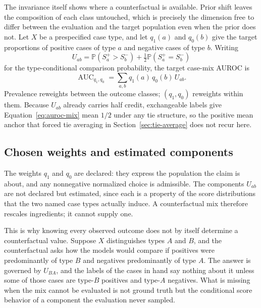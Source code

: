\documentclass[11pt]{article}
\newcommand{\Prb}{\mathbb{P}}
\theoremstyle{remark}
\begin{document}
The invariance itself shows where a counterfactual is available. Prior shift leaves the composition of each class untouched, which is precisely the dimension free to differ between the evaluation and the target population even when the prior does not.
Let $X$ be a prespecified case type, and let $q_1(a)$ and $q_0(b)$ give the
target proportions of positive cases of type $a$ and negative cases of type
$b$. Writing
\[
U_{ab}
=
\Prb(S_a^+>S_b^-)
+\tfrac12\Prb(S_a^+=S_b^-)
\]
for the type-conditional comparison probability, the target case-mix AUROC is
\begin{equation}
\operatorname{AUC}_{q_1,q_0}
=
\sum_{a,b}q_1(a)\,q_0(b)\,U_{ab}.
\label{eq:auroc-mix}
\end{equation}
Prevalence reweights between the outcome classes; $(q_1,q_0)$ reweights within
them. Because $U_{ab}$ already carries half credit, exchangeable labels give
Equation~\eqref{eq:auroc-mix} mean $1/2$ under any tie structure, so the
positive mean anchor that forced tie averaging in Section~\ref{sec:tie-average}
does not recur here.

\subsection{Chosen weights and estimated components}

The weights $q_1$ and $q_0$ are
declared: they express the population the claim is about, and any nonnegative
normalized choice is admissible. The components $U_{ab}$ are not declared but
estimated, since each is a property of the score distributions that the two
named case types actually induce. A counterfactual mix therefore rescales
ingredients; it cannot supply one.

This is why knowing every observed outcome does not by itself determine a
counterfactual value. Suppose $X$ distinguishes types $A$ and $B$, and the
counterfactual asks how the models would compare if positives were
predominantly of type $B$ and negatives predominantly of type $A$. The answer
is governed by $U_{BA}$, and the labels of the cases in hand say nothing about
it unless some of those cases are type-$B$ positives and type-$A$ negatives.
What is missing when the mix cannot be evaluated is not ground truth but the
conditional score behavior of a component the evaluation never sampled.
\end{document}
